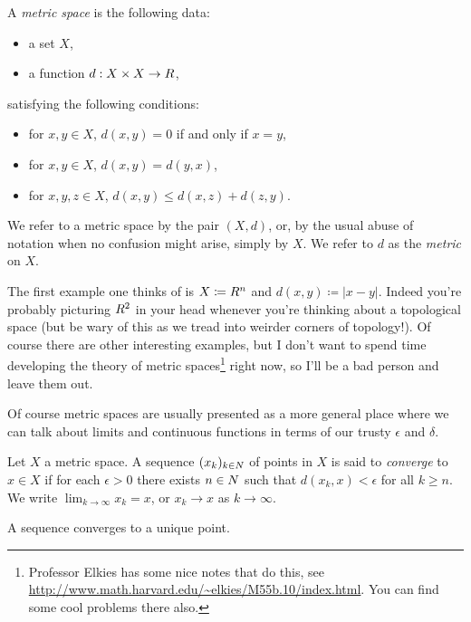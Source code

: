 \begin{definition}
  A \textit{metric space} is the following data:
  \begin{itemize}
  \item a set $X$,
  \item a function $d : X \times X \to R$,
  \end{itemize}
  satisfying the following conditions:
  \begin{itemize}
  \item for $x,y \in X$, $d(x,y) = 0$ if and only if $x = y$,
  \item for $x,y \in X$, $d(x,y) = d(y,x)$,
  \item for $x,y,z \in X$, $d(x,y) \le d(x,z) + d(z,y)$.
  \end{itemize}
  We refer to a metric space by the pair $(X, d)$, or, by the usual
  abuse of notation when no confusion might arise, simply by $X$. We
  refer to $d$ as the \textit{metric} on $X$.
\end{definition}

\begin{example}
  The first example one thinks of is $X \coloneqq R^n$ and $d(x,y)
  \coloneqq |x-y|$. Indeed you're probably picturing $R^2$ in your
  head whenever you're thinking about a topological space (but be wary
  of this as we tread into weirder corners of topology!). Of course
  there are other interesting examples, but I don't want to spend time
  developing the theory of metric spaces\footnote{Professor Elkies has
    some nice notes that do this, see
    \url{http://www.math.harvard.edu/~elkies/M55b.10/index.html}. You
    can find some cool problems there also.} right now, so I'll be a
  bad person and leave them out.
\end{example}

Of course metric spaces are usually presented as a more general place
where we can talk about limits and continuous functions in terms of
our trusty $\epsilon$ and $\delta$.

\begin{definition}
  Let $X$ a metric space. A sequence $(x_k)_{k \in N}$ of points in
  $X$ is said to \textit{converge} to $x \in X$ if for each $\epsilon
  > 0$ there exists $n \in N$ such that $d(x_k,x) < \epsilon$ for all
  $k \ge n$. We write $\lim_{k \to \infty} x_k = x$, or $x_k \to x$ as
  $k \to \infty$.
\end{definition}

\begin{exercise}
  A sequence converges to a unique point.
\end{exercise}

